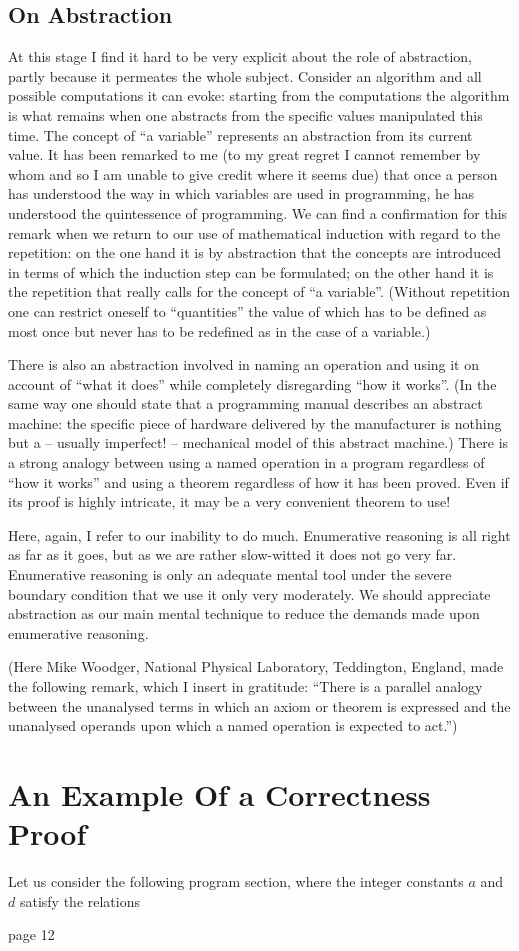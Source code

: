 \subsection{On Abstraction}

At this stage I find it hard to be very explicit about the role of abstraction, partly because it permeates the whole subject. Consider an algorithm and all possible computations it can evoke: starting from the computations the algorithm is what remains when one abstracts from the specific values manipulated this time. The concept of ``a variable'' represents an abstraction from its current value. It has been remarked to me (to my great regret I cannot remember by whom and so I am unable to give credit where it seems due) that once a person has understood the way in which variables are used in programming, he has understood the quintessence of programming. We can find a confirmation for this remark when we return to our use of mathematical induction with regard to the repetition: on the one hand it is by abstraction that the concepts are introduced in terms of which the induction step can be formulated; on the other hand it is the repetition that really calls for the concept of ``a variable''. (Without repetition one can restrict oneself to ``quantities'' the value of which has to be defined as most once but never has to be redefined as in the case of a variable.)

There is also an abstraction involved in naming an operation and using it on account of ``what it does'' while completely disregarding ``how it works''. (In the same way one should state that a programming manual describes an abstract machine: the specific piece of hardware delivered by the manufacturer is nothing but a -- usually imperfect! -- mechanical model of this abstract machine.) There is a strong analogy between using a named operation in a program regardless of ``how it works'' and using a theorem regardless of how it has been proved. Even if its proof is highly intricate, it may be a very convenient theorem to use!

Here, again, I refer to our inability to do much. Enumerative reasoning is all right as far as it goes, but as we are rather slow-witted it does not go very
far. Enumerative reasoning is only an adequate mental tool under the severe boundary condition that we use it only very moderately. We should appreciate
abstraction as our main mental technique to reduce the demands made upon enumerative reasoning.

(Here Mike Woodger, National Physical Laboratory, Teddington, England, made the following remark, which I insert in gratitude: ``There is a parallel analogy between the unanalysed terms in which an axiom or theorem is expressed and the unanalysed operands upon which a named operation is expected to act.'')

\section{An Example Of a Correctness Proof}

Let us consider the following program section, where the integer constants $a$ and $d$ satisfy the relations

page 12